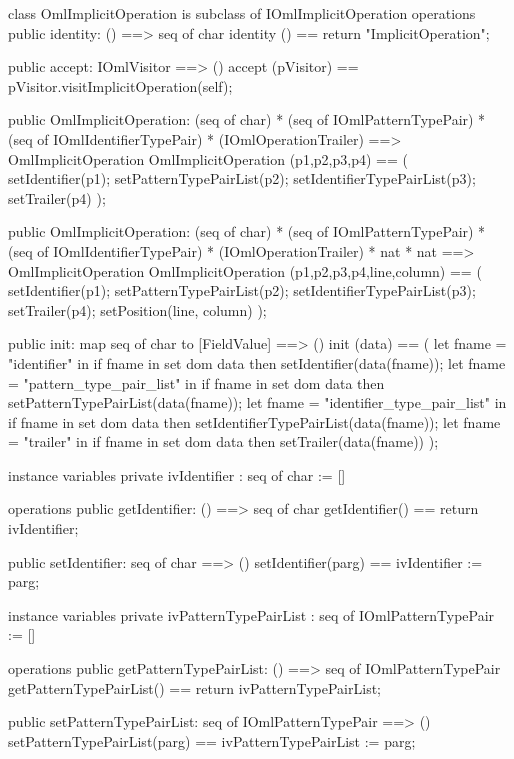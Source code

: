 \begin{vdm_al}
class OmlImplicitOperation is subclass of IOmlImplicitOperation
operations
  public identity: () ==> seq of char
  identity () == return "ImplicitOperation";

  public accept: IOmlVisitor ==> ()
  accept (pVisitor) == pVisitor.visitImplicitOperation(self);

  public OmlImplicitOperation:
    (seq of char) *
    (seq of IOmlPatternTypePair) *
    (seq of IOmlIdentifierTypePair) *
    (IOmlOperationTrailer) ==> OmlImplicitOperation
  OmlImplicitOperation (p1,p2,p3,p4) == 
    ( setIdentifier(p1);
      setPatternTypePairList(p2);
      setIdentifierTypePairList(p3);
      setTrailer(p4) );

  public OmlImplicitOperation:
    (seq of char) *
    (seq of IOmlPatternTypePair) *
    (seq of IOmlIdentifierTypePair) *
    (IOmlOperationTrailer) *
    nat *
    nat ==> OmlImplicitOperation
  OmlImplicitOperation (p1,p2,p3,p4,line,column) == 
    ( setIdentifier(p1);
      setPatternTypePairList(p2);
      setIdentifierTypePairList(p3);
      setTrailer(p4);
      setPosition(line, column) );

  public init: map seq of char to [FieldValue] ==> ()
  init (data) ==
    ( let fname = "identifier" in
        if fname in set dom data
        then setIdentifier(data(fname));
      let fname = "pattern_type_pair_list" in
        if fname in set dom data
        then setPatternTypePairList(data(fname));
      let fname = "identifier_type_pair_list" in
        if fname in set dom data
        then setIdentifierTypePairList(data(fname));
      let fname = "trailer" in
        if fname in set dom data
        then setTrailer(data(fname)) );

instance variables
  private ivIdentifier : seq of char := []

operations
  public getIdentifier: () ==> seq of char
  getIdentifier() == return ivIdentifier;

  public setIdentifier: seq of char ==> ()
  setIdentifier(parg) == ivIdentifier := parg;

instance variables
  private ivPatternTypePairList : seq of IOmlPatternTypePair := []

operations
  public getPatternTypePairList: () ==> seq of IOmlPatternTypePair
  getPatternTypePairList() == return ivPatternTypePairList;

  public setPatternTypePairList: seq of IOmlPatternTypePair ==> ()
  setPatternTypePairList(parg) == ivPatternTypePairList := parg;


\end{vdm_al}
